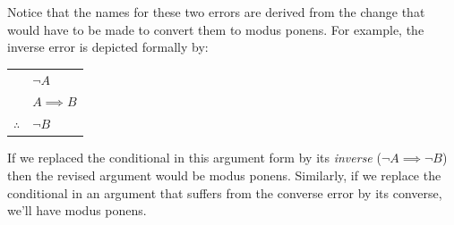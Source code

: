 Notice that the names for these two errors are derived from the change 
that would have to be made to convert them to modus ponens.  For example, 
the inverse error is depicted formally by:

\begin{center}
\begin{tabular}{cl}
 & ${\lnot}A$ \\
 & $A \implies B$ \\ \hline
$\therefore$ & ${\lnot}B$ \\
\end{tabular}
\end{center}

If we replaced the conditional in this argument form by its {\em inverse} 
(${\lnot}A \implies {\lnot}B$) then the revised argument would be 
modus ponens.  Similarly, if we replace the conditional in an
argument that suffers from the converse error by its converse, 
we'll have modus ponens.

\clearpage




%
%




